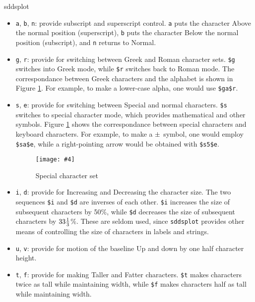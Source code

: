 \begin{sddsprog}{sddsplot}
\begin{itemize}
\item {\tt a}, {\tt b}, {\tt n}: provide subscript and superscript control.  {\tt a} puts the character Above the
normal position (superscript), {\tt b} puts the character Below the normal position (subscript), and {\tt n}
returns to Normal.

\item {\tt g}, {\tt r}: provide for switching between Greek and Roman
character sets. \verb|$g| switches into Greek mode, while \verb|$r|
switches back to Roman mode.  The correspondance between Greek
characters and the alphabet is shown in Figure \ref{CharSet}.  For
example, to make a lower-case alpha, one would use \verb|$ga$r|.

\item {\tt s}, {\tt e}: provide for switching between Special and
normal characters.  \verb|$s| switches to special character mode,
which provides mathematical and other symbols.  Figure \ref{CharSet}
shows the correspondance between special characters and keyboard
characters.  For example, to make a ${\rm \pm}$ symbol, one would
employ \verb|$sa$e|, while a right-pointing arrow would be obtained
with \verb|$s5$e|.

\newcommand{\PSFigure}[4]{\begin{figure}[htb]
  \vspace{-0.38in}
  \texttt{[image: \#4]}
  \vspace{-0.57in}
  \caption[#2]{#2}\label{#3}
  \end{figure}}

\PSFigure{15cm}{Special character set}{CharSet}{charSet.eps}

\item {\tt i}, {\tt d}: provide for Increasing and Decreasing the
character size.  The two sequences \verb|$i| and \verb|$d| are
inverses of each other.  \verb|$i| increases the size of subsequent
characters by 50\%, while \verb|$d| decreases the size of subsequent
characters by ${\rm 33 \frac{1}{3}}$\%.  These are seldom used, since
\verb|sddsplot| provides other means of controlling the size of
characters in labels and strings.

\item {\tt u}, {\tt v}: provide for motion of the baseline Up and down by one half character height.  

\item {\tt t}, {\tt f}: provide for making Taller and Fatter characters.  \verb|$t| makes characters twice as
tall while maintaining width, while \verb|$f| makes characters half as tall while maintaining width.  


\end{itemize}
\end{sddsprog}
